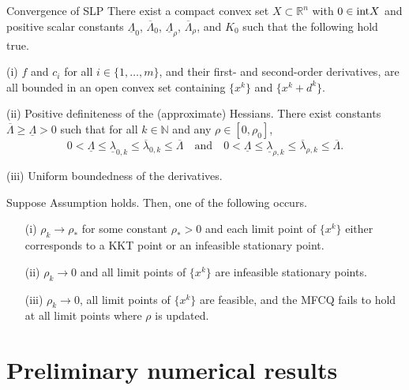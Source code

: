 \documentclass[8pt]{beamer}
\begin{document}
	\begin{frame}{Convergence of SLP}
		\bassumption
				There exist a compact convex set $X \subset \mathbb{R}^n$ with $0 \in {\rm{int}}{X}$ and positive scalar constants $\underline\Lambda_0$, $\overline\Lambda_0$, $\underline\Lambda_\rho$, $\overline\Lambda_\rho$, and $K_0$ such that the following hold true.
				\benumerate
						\item[(i)] $f$ and $c_i$ for all $i \in \{1,\dots,m\}$, and their first- and second-order derivatives, are all  bounded in an open convex set containing $\{x^k\}$ and $\{x^k+d^k\}$.
						\item[(ii)] Positive definiteness of the (approximate) Hessians. There exist constants $\overline\Lambda \ge \underline\Lambda > 0$ such that for all $k\in\mathbb{N}$ and  any $\rho\in[0, \rho_0]$,  
						\[ 0< \underline\Lambda \le \underline\lambda_{0,k} \leq \overline\lambda_{0,k} \leq \overline\Lambda\quad \text{and}\quad 0 < \underline\Lambda \leq \underline\lambda_{\rho,k} \leq \overline\lambda_{\rho,k} \le \overline\Lambda.\]
						\item[(iii)] Uniform boundedness of the derivatives. 
				\eenumerate
		\eassumption

		\vfill

		\begin{theorem}  Suppose Assumption  holds. Then, one of the following occurs.
		\begin{enumerate}
		\item[(i)]  $\rho_k \to \rho_*$ for some constant $\rho_*>0$ and each limit point of $\{x^k\}$ either corresponds 
		to a KKT point or an infeasible stationary point.
		\item[(ii)] $\rho_k \to 0$ and all limit points of $\{x^k\}$ are infeasible stationary points.
		\item[(iii)]  $\rho_k \to 0$, all limit points of $\{x^k\}$ are feasible, and the MFCQ fails to hold at all limit points 
		where $\rho$ is updated. 
			
		\end{enumerate}
			
		\end{theorem}

	\end{frame}

\section{Preliminary numerical results}

	
			
\end{document}
